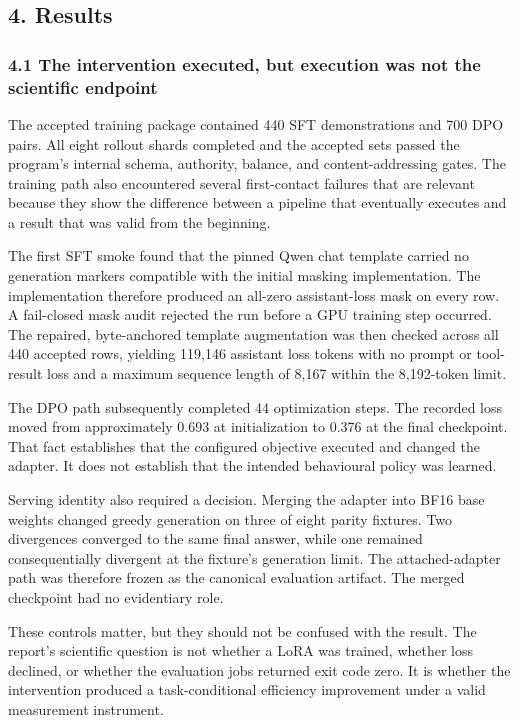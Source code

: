 \documentclass[
]{article}
\begin{document}
\subsection{4. Results}\label{4-results}

\subsubsection{4.1 The intervention executed, but execution was not the
scientific
endpoint}\label{41-the-intervention-executed-but-execution-was-not-the-scientific-endpoint}

The accepted training package contained 440 SFT demonstrations and 700
DPO pairs. All eight rollout shards completed and the accepted sets
passed the program's internal schema, authority, balance, and
content-addressing gates. The training path also encountered several
first-contact failures that are relevant because they show the
difference between a pipeline that eventually executes and a result that
was valid from the beginning.

The first SFT smoke found that the pinned Qwen chat template carried no
generation markers compatible with the initial masking implementation.
The implementation therefore produced an all-zero assistant-loss mask on
every row. A fail-closed mask audit rejected the run before a GPU
training step occurred. The repaired, byte-anchored template
augmentation was then checked across all 440 accepted rows, yielding
119,146 assistant loss tokens with no prompt or tool-result loss and a
maximum sequence length of 8,167 within the 8,192-token limit.

The DPO path subsequently completed 44 optimization steps. The recorded
loss moved from approximately 0.693 at initialization to 0.376 at the
final checkpoint. That fact establishes that the configured objective
executed and changed the adapter. It does not establish that the
intended behavioural policy was learned.

Serving identity also required a decision. Merging the adapter into BF16
base weights changed greedy generation on three of eight parity
fixtures. Two divergences converged to the same final answer, while one
remained consequentially divergent at the fixture's generation limit.
The attached-adapter path was therefore frozen as the canonical
evaluation artifact. The merged checkpoint had no evidentiary role.

These controls matter, but they should not be confused with the result.
The report's scientific question is not whether a LoRA was trained,
whether loss declined, or whether the evaluation jobs returned exit code
zero. It is whether the intervention produced a task-conditional
efficiency improvement under a valid measurement instrument.
\end{document}
